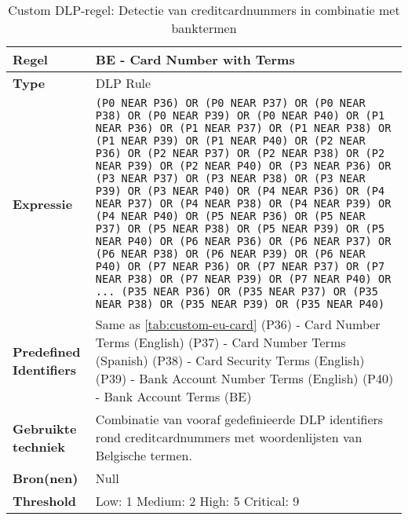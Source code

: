 \begin{table}[h]
    \centering
    \small
    \begin{tabular}{p{4cm} p{10cm}}
        \toprule
        \textbf{Regel} & BE - Card Number with Terms \\
        \midrule
        \textbf{Type} & DLP Rule \\
        \textbf{Expressie} & \texttt{(P0 NEAR P36) OR (P0 NEAR P37) OR (P0 NEAR P38) OR (P0 NEAR P39) OR (P0 NEAR P40) OR (P1 NEAR P36) OR (P1 NEAR P37) OR (P1 NEAR P38) OR (P1 NEAR P39) OR (P1 NEAR P40) OR (P2 NEAR P36) OR (P2 NEAR P37) OR (P2 NEAR P38) OR (P2 NEAR P39) OR (P2 NEAR P40) OR (P3 NEAR P36) OR (P3 NEAR P37) OR (P3 NEAR P38) OR (P3 NEAR P39) OR (P3 NEAR P40) OR (P4 NEAR P36) OR (P4 NEAR P37) OR (P4 NEAR P38) OR (P4 NEAR P39) OR (P4 NEAR P40) OR (P5 NEAR P36) OR (P5 NEAR P37) OR (P5 NEAR P38) OR (P5 NEAR P39) OR (P5 NEAR P40) OR (P6 NEAR P36) OR (P6 NEAR P37) OR (P6 NEAR P38) OR (P6 NEAR P39) OR (P6 NEAR P40) OR (P7 NEAR P36) OR (P7 NEAR P37) OR (P7 NEAR P38) OR (P7 NEAR P39) OR (P7 NEAR P40) OR \newline
        ... \newline
        (P35 NEAR P36) OR (P35 NEAR P37) OR (P35 NEAR P38) OR (P35 NEAR P39) OR (P35 NEAR P40)} \\
        \textbf{Predefined Identifiers} & 
        Same as \ref{tab:custom-eu-card} \newline
        (P36) - Card Number Terms (English) \newline
        (P37) - Card Number Terms (Spanish) \newline
        (P38) - Card Security Terms (English) \newline
        (P39) - Bank Account Number Terms (English) \newline
        (P40) - Bank Account Terms (BE) \\
        \textbf{Gebruikte techniek} & Combinatie van vooraf gedefinieerde DLP identifiers rond creditcardnummers met woordenlijsten van Belgische termen. \\
        \textbf{Bron(nen)} & Null \\
        \textbf{Threshold} & Low: 1 \quad Medium: 2 \quad High: 5 \quad Critical: 9 \\
        \bottomrule
    \end{tabular}
    \caption{Custom DLP-regel: Detectie van creditcardnummers in combinatie met banktermen}
    \label{tab:custom-eu-card-terms}
\end{table}



